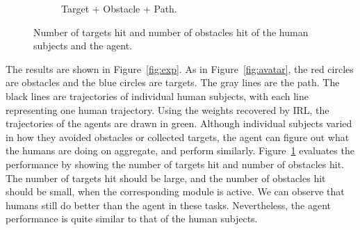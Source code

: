 \begin{figure}[h]
\begin{subfigure}[b]{0.24\textwidth}
\caption{Target + Obstacle + Path. }
\end{subfigure}
\caption{Number of targets hit and number of obstacles hit of the human subjects 
and the agent.}
\label{fig:stats}
\end{figure}


The results are shown in Figure~\ref{fig:exp}. As in Figure~\ref{fig:avatar},
the red circles are obstacles and the blue circles are targets. The gray lines
are the path. The black lines are trajectories of individual human subjects,
with each line representing one human trajectory.  Using the weights recovered
by IRL, the trajectories of the agents are drawn in green. Although individual
subjects varied in how they avoided obstacles or collected targets, the agent
can figure out what the humans are doing on aggregate, and perform similarly.
Figure~\ref{fig:stats} evaluates the performance by showing the number of
targets hit and number of obstacles hit.  The number of targets hit should be
large, and the number of obstacles hit should be small, when the corresponding
module is active.  We can observe that humans still do better than the agent in
these tasks.  Nevertheless, the agent performance is quite similar to that of
the human subjects.

